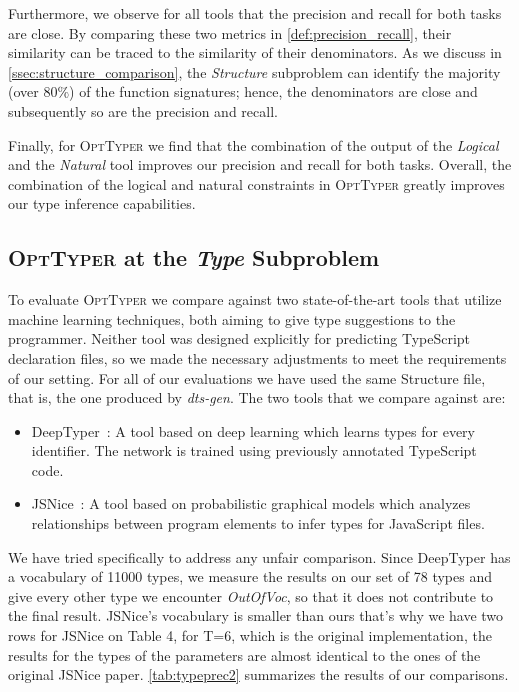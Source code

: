 \documentclass[sigplan,10pt,review,anonymous]{acmart} %
\newcommand{\projectname}{\textsc{OptTyper}\xspace}
\theoremstyle{plain}
\theoremstyle{remark}
\theoremstyle{definition}
\begin{document}
Furthermore, we observe for all tools that the precision and recall for both tasks are close.
By comparing these two metrics in \cref{def:precision_recall},
their similarity can be traced to the similarity of their denominators.
As we discuss in \cref{ssec:structure_comparison},
the \textit{Structure} subproblem can identify the majority (over $80\%$) of the function signatures;
hence, the denominators are close and subsequently so are the precision and recall.

Finally, for \projectname we find that the combination of the output of the \textit{Logical}
and the \textit{Natural} tool improves our precision and recall for both tasks.
Overall, the combination of the logical and natural constraints in \projectname
greatly improves our type inference capabilities.

\subsection{\projectname at the \textit{Type} Subproblem}
\label{ssec:typesubproblem}

To evaluate \projectname we compare against two state-of-the-art tools that utilize machine learning techniques,
both aiming to give type suggestions to the programmer.
Neither tool was designed explicitly for predicting TypeScript declaration files,
so we made the necessary adjustments to meet the requirements of our setting.
For all of our evaluations we have used the same Structure file, that is, the one produced by \textit{dts-gen}.
The two tools that we compare against are:
\begin{itemize}[label={\tiny$\bullet$}]
	\item DeepTyper~\cite{hellendoorn18}: A tool based on deep learning which learns types for every identifier.
	      The network is trained using previously annotated TypeScript code.
	\item JSNice~\cite{raychev15}: A tool based on probabilistic graphical models which analyzes relationships
	      between program elements to infer types for JavaScript files.
\end{itemize}

We have tried specifically to address any unfair comparison.
Since DeepTyper has a vocabulary of 11000 types, we measure the results on our set of 78 types
and give every other type we encounter \textit{OutOfVoc}, so that it does not contribute to the final result.
JSNice's vocabulary is smaller than ours that's why we have two rows for JSNice on Table 4, for T=6,
which is the original implementation,
the results for the types of the parameters are almost identical to the ones of the original JSNice paper.
\cref{tab:typeprec2} summarizes the results of our comparisons.
\end{document}
